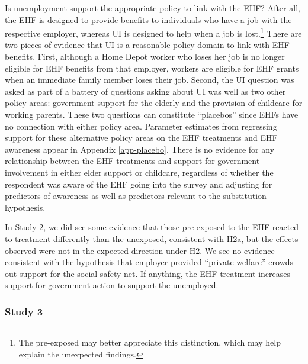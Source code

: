 \documentclass[
  11pt,
  oneside]{article}
\begin{document}
Is unemployment support the appropriate policy to link with the EHF? After all, the EHF is designed to provide benefits to individuals who have a job with the respective employer, whereas UI is designed to help when a job is lost.\footnote{The pre-exposed may better appreciate this distinction, which may help explain the unexpected findings.} There are two pieces of evidence that UI is a reasonable policy domain to link with EHF benefits. First, although a Home Depot worker who loses her job is no longer eligible for EHF benefits from that employer, workers are eligible for EHF grants when an immediate family member loses their job. Second, the UI question was asked as part of a battery of questions asking about UI was well as two other policy areas: government support for the elderly and the provision of childcare for working parents. These two questions can constitute ``placebos'' since EHFs have no connection with either policy area. Parameter estimates from regressing support for these alternative policy areas on the EHF treatments and EHF awareness appear in Appendix \ref{app-placebo}. There is no evidence for any relationship between the EHF treatments and support for government involvement in either elder support or childcare, regardless of whether the respondent was aware of the EHF going into the survey and adjusting for predictors of awareness as well as predictors relevant to the substitution hypothesis.

In Study 2, we did see some evidence that those pre-exposed to the EHF reacted to treatment differently than the unexposed, consistent with H2a, but the effects observed were not in the expected direction under H2. We see no evidence consistent with the hypothesis that employer-provided ``private welfare'' crowds out support for the social safety net. If anything, the EHF treatment increases support for government action to support the unemployed.

\subsubsection{Study 3}\label{study-3}
\end{document}
